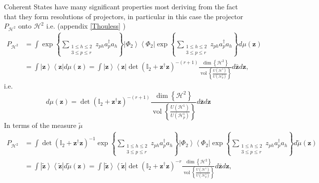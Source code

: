 \documentclass[aps,preprint]{revtex4}%
\begin{document}
Coherent States have many significant properties \cite{Gilmore}
\cite{Peremilov} \cite{weiner} \cite{Orhn} \cite{Klauder} most deriving from
the fact that they form resolutions of projectors, in particular in this case
the projector $P_{\mathcal{H}^{2}}$ onto $\mathcal{H}^{2}$ i.e. (appendix
\ref{Thouless}\cite{Blaiz&Orland} )
\begin{align}
P_{\mathcal{H}^{2}}  &  =\int\exp\left\{  \sum\limits_{\substack{1\leq
h\leq2\\3\leq p\leq r}}z_{ph}a_{p}^{\dagger}a_{h}\right\}  \left\vert \Phi
_{2}\right\rangle \left\langle \Phi_{2}\right\vert \exp\left\{  \sum
\limits_{\substack{1\leq h\leq2\\3\leq p\leq r}}z_{ph}a_{p}^{\dagger}%
a_{h}\right\}  d\mu\left(  \mathbf{z}\right) \nonumber\\
&  =\int\left\vert \mathbf{z}\right\rangle \left\langle \mathbf{z}\right\vert
d\mu\left(  \mathbf{z}\right)  =\int\left\vert \mathbf{z}\right\rangle
\left\langle \mathbf{z}\right\vert \det\left(  \mathbb{I}_{2}+\mathbf{z}%
^{\dagger}\mathbf{z}\right)  ^{-\left(  r+1\right)  }\frac{\dim\left\{
\mathcal{H}^{2}\right\}  }{\operatorname*{vol}\left\{  \frac{U\left(
\mathcal{H}^{1}\right)  }{U\left(  \mathcal{H}_{p}^{1}\right)  }\right\}
}d\mathbf{\bar{z}}d\mathbf{z}, \label{CS Proj}%
\end{align}
i.e.
\begin{equation}
d\mu\left(  \mathbf{z}\right)  =\det\left(  \mathbb{I}_{2}+\mathbf{z}%
^{\dagger}\mathbf{z}\right)  ^{-\left(  r+1\right)  }\frac{\dim\left\{
\mathcal{H}^{2}\right\}  }{\operatorname*{vol}\left\{  \frac{U\left(
\mathcal{H}^{1}\right)  }{U\left(  \mathcal{H}_{p}^{1}\right)  }\right\}
}d\mathbf{\bar{z}}d\mathbf{z}%
\end{equation}
In terms of the measure $\tilde{\mu}$
\begin{align}
P_{\mathcal{H}^{2}}  &  =%
{\displaystyle\int}
\det\left(  \mathbb{I}_{2}+\mathbf{z}^{\dagger}\mathbf{z}\right)  ^{-1}%
\exp\left\{  \sum\limits_{\substack{1\leq h\leq2\\3\leq p\leq r}}z_{ph}%
a_{p}^{\dagger}a_{h}\right\}  \left\vert \Phi_{2}\right\rangle \left\langle
\Phi_{2}\right\vert \exp\left\{  \sum\limits_{\substack{1\leq h\leq2\\3\leq
p\leq r}}z_{ph}a_{p}^{\dagger}a_{h}\right\}  d\tilde{\mu}\left(
\mathbf{z}\right) \nonumber\\
&  =\int\left\vert \mathbf{\tilde{z}}\right\rangle \left\langle \mathbf{\tilde
{z}}\right\vert d\tilde{\mu}\left(  \mathbf{z}\right)  =\int\left\vert
\mathbf{\tilde{z}}\right\rangle \left\langle \mathbf{\tilde{z}}\right\vert
\det\left(  \mathbb{I}_{2}+\mathbf{z}^{\dagger}\mathbf{z}\right)  ^{-r}%
\frac{\dim\left\{  \mathcal{H}^{2}\right\}  }{\operatorname*{vol}\left\{
\frac{U\left(  \mathcal{H}^{1}\right)  }{U\left(  \mathcal{H}_{p}^{1}\right)
}\right\}  }d\mathbf{\bar{z}}d\mathbf{z},
\end{align}
\end{document}

